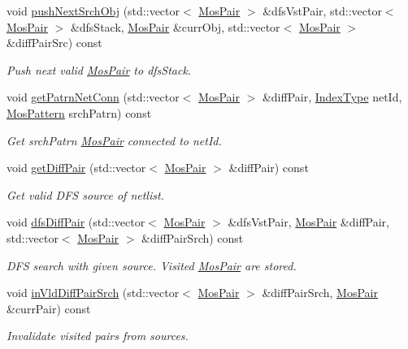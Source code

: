 \begin{DoxyCompactItemize}
void \hyperlink{classSymDetect_a7f4cd1010a21da88d35abb89c6f33f00}{push\+Next\+Srch\+Obj} (std\+::vector$<$ \hyperlink{classMosPair}{Mos\+Pair} $>$ \&dfs\+Vst\+Pair, std\+::vector$<$ \hyperlink{classMosPair}{Mos\+Pair} $>$ \&dfs\+Stack, \hyperlink{classMosPair}{Mos\+Pair} \&curr\+Obj, std\+::vector$<$ \hyperlink{classMosPair}{Mos\+Pair} $>$ \&diff\+Pair\+Src) const
\begin{DoxyCompactList}\small\item\em Push next valid \hyperlink{classMosPair}{Mos\+Pair} to dfs\+Stack. \end{DoxyCompactList}\item 
void \hyperlink{classSymDetect_af7d1b22086aa98a27b1eafc9266596d8}{get\+Patrn\+Net\+Conn} (std\+::vector$<$ \hyperlink{classMosPair}{Mos\+Pair} $>$ \&diff\+Pair, \hyperlink{type_8h_a581e8093e28e7362f2b6937296190676}{Index\+Type} net\+Id, \hyperlink{type_8h_af19eddb079bfea723256710b029c38e8}{Mos\+Pattern} srch\+Patrn) const
\begin{DoxyCompactList}\small\item\em Get srch\+Patrn \hyperlink{classMosPair}{Mos\+Pair} connected to net\+Id. \end{DoxyCompactList}\item 
void \hyperlink{classSymDetect_af04b93dac7e090cef8e741d8d1812485}{get\+Diff\+Pair} (std\+::vector$<$ \hyperlink{classMosPair}{Mos\+Pair} $>$ \&diff\+Pair) const
\begin{DoxyCompactList}\small\item\em Get valid D\+FS source of netlist. \end{DoxyCompactList}\item 
void \hyperlink{classSymDetect_acd33a2c834493240fc4e8840819d676c}{dfs\+Diff\+Pair} (std\+::vector$<$ \hyperlink{classMosPair}{Mos\+Pair} $>$ \&dfs\+Vst\+Pair, \hyperlink{classMosPair}{Mos\+Pair} \&diff\+Pair, std\+::vector$<$ \hyperlink{classMosPair}{Mos\+Pair} $>$ \&diff\+Pair\+Srch) const
\begin{DoxyCompactList}\small\item\em D\+FS search with given source. Visited \hyperlink{classMosPair}{Mos\+Pair} are stored. \end{DoxyCompactList}\item 
void \hyperlink{classSymDetect_ae6a1ba27f6768f215cba0623b6e2ce08}{in\+Vld\+Diff\+Pair\+Srch} (std\+::vector$<$ \hyperlink{classMosPair}{Mos\+Pair} $>$ \&diff\+Pair\+Srch, \hyperlink{classMosPair}{Mos\+Pair} \&curr\+Pair) const
\begin{DoxyCompactList}\small\item\em Invalidate visited pairs from sources. \end{DoxyCompactList}\item 

\end{DoxyCompactItemize}

